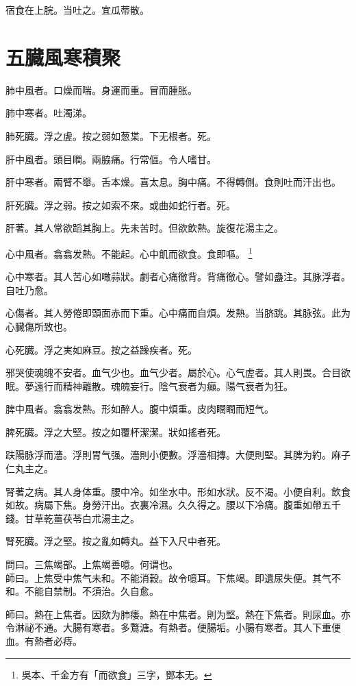 \documentclass[b5paper,twoside,zihao=-4,UTF8]{ctexbook}
\begin{document}
宿食在上脘。当吐之。宜瓜蒂散。

\chapter{五臓風寒積聚}

肺中風者。口燥而喘。身運而重。冒而腫胀。

肺中寒者。吐濁涕。

肺死臓。浮之虗。按之弱如葱枼。下无根者。死。

肝中風者。頭目瞤。兩脇痛。行常傴。令人嗜甘。

肝中寒者。兩臂不舉。舌本燥。喜太息。胸中痛。不得轉側。食則吐而汗出也。

肝死臓。浮之弱。按之如索不來。或曲如蛇行者。死。

肝著。其人常欲蹈其胸上。先未苦时。但欲飲熱。旋復花湯主之。

心中風者。翕翕发熱。不能起。心中飢{而欲食}。食即嘔。
	\footnote{吳本、千金方有「而欲食」三字，鄧本无。}

心中寒者。其人苦心如噉蒜狀。劇者心痛徹背。背痛徹心。譬如蠱注。其脉浮者。自吐乃愈。

心傷者。其人勞倦即頭面赤而下重。心中痛而自煩。发熱。当脐跳。其脉弦。此为心臓傷所致也。

心死臓。浮之実如麻豆。按之益躁疾者。死。

邪哭使魂魄不安者。血气少也。血气少者。屬於心。心气虗者。其人則畏。合目欲眠。夢遠行而精神離散。魂魄妄行。陰气衰者为癲。陽气衰者为狂。

脾中風者。翕翕发熱。形如醉人。腹中煩重。皮肉瞤瞤而短气。

脾死臓。浮之大堅。按之如覆杯潔潔。狀如搖者死。

趺陽脉浮而濇。浮則胃气强。濇則小便數。浮濇相摶。大便則堅。其脾为約。麻子仁丸主之。

腎著之病。其人身体重。腰中冷。如坐水中。形如水狀。反不渴。小便自利。飲食如故。病屬下焦。身勞汗出。衣裏冷濕。久久得之。腰以下冷痛。腹重如帶五千錢。甘{草乾}薑{茯}苓{白}朮湯主之。

腎死臓。浮之堅。按之亂如轉丸。益下入尺中者死。

問曰。三焦竭部。上焦竭善噫。何谓也。\\
師曰。上焦受中焦气未和。不能消穀。故令噫耳。下焦竭。即遺尿失便。其气不和。不能自禁制。不須治。久自愈。

師曰。熱在上焦者。因欬为肺痿。熱在中焦者。則为堅。熱在下焦者。則尿血。亦令淋祕不通。大腸有寒者。多鶩溏。有熱者。便腸垢。小腸有寒者。其人下重便血。有熱者必痔。
\end{document}
